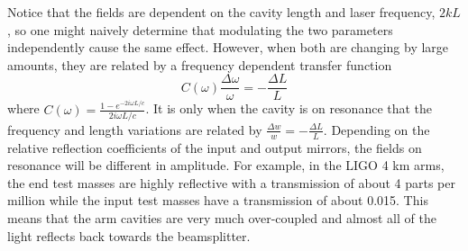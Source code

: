 		Notice that the fields are dependent on the cavity length and laser frequency, $2kL$, so one might naively determine that modulating the two parameters independently cause the same effect.  However, when both are changing by large amounts, they are related by a frequency dependent transfer function \cite{dynamicFP}
		\begin{equation}
		C(\omega) \frac{\Delta \omega}{\omega} = -\frac{\Delta L}{L}
		\end{equation}
		where $C(\omega) = \frac{1-e^{-2i\omega L/c}}{2i\omega L/c}$. It is only when the cavity is on resonance that the frequency and length variations are related by $\frac{\Delta w}{w} = -\frac{\Delta L}{L}$.
		Depending on the relative reflection coefficients of the input and output mirrors, the fields on resonance will be different in amplitude.  For example, in the LIGO 4 km arms, the end test masses are highly reflective with a transmission of about 4 parts per million while the input test masses have a transmission of about 0.015.  This means that the arm cavities are very much over-coupled and almost all of the light reflects back towards the beamsplitter.
